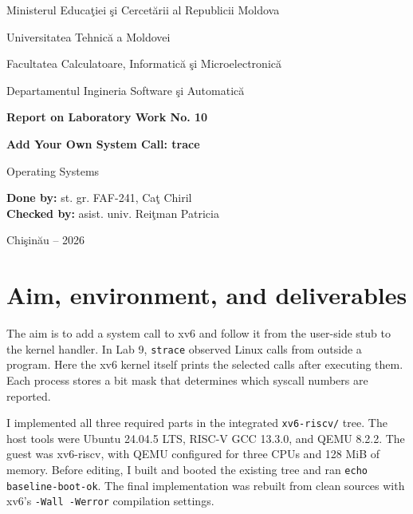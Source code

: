 \documentclass[12pt]{article}
\begin{document}
\begin{titlepage}
\centering
{\large Ministerul Educa\c{t}iei \c{s}i Cercet\u{a}rii al Republicii Moldova\par}
\vspace{0.45cm}
{\large Universitatea Tehnic\u{a} a Moldovei\par}
\vspace{0.45cm}
{\large Facultatea Calculatoare, Informatic\u{a} \c{s}i Microelectronic\u{a}\par}
\vspace{0.45cm}
{\large Departamentul Ingineria Software \c{s}i Automatic\u{a}\par}
\vspace{3cm}
{\Large\bfseries Report on Laboratory Work No. 10\par}
\vspace{0.55cm}
{\LARGE\bfseries Add Your Own System Call: trace\par}
\vspace{0.35cm}
{\large Operating Systems\par}
\vfill
\begin{flushleft}
\textbf{Done by:} st. gr. FAF-241, Ca\c{t} Chiril\\[0.8cm]
\textbf{Checked by:} asist. univ. Rei\c{t}man Patricia
\end{flushleft}
\vfill
{Chi\c{s}in\u{a}u -- 2026\par}
\end{titlepage}
\tableofcontents
\clearpage
{}

\section{Aim, environment, and deliverables}
The aim is to add a system call to xv6 and follow it from the user-side
stub to the kernel handler. In Lab 9, \texttt{strace} observed Linux calls
from outside a program. Here the xv6 kernel itself prints the selected
calls after executing them. Each process stores a bit mask that determines
which syscall numbers are reported.

I implemented all three required parts in the integrated
\texttt{xv6-riscv/} tree. The host tools were Ubuntu 24.04.5 LTS,
RISC-V GCC 13.3.0, and QEMU 8.2.2. The guest was xv6-riscv, with QEMU
configured for three CPUs and 128 MiB of memory. Before editing, I built
and booted the existing tree and ran \texttt{echo baseline-boot-ok}.
The final implementation was rebuilt from clean sources with xv6's
\texttt{-Wall -Werror} compilation settings.
\end{document}
